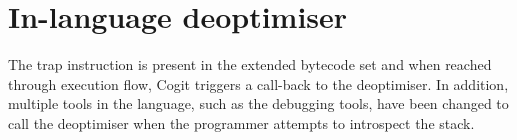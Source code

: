 \documentclass[a4paper,12pt,twoside]{../includes/ThesisStyle}
\begin{document}









\section{In-language deoptimiser}

The trap instruction is present in the extended bytecode set and when reached through execution flow, Cogit triggers a call-back to the deoptimiser. In addition, multiple tools in the language, such as the debugging tools, have been changed to call the deoptimiser when the programmer attempts to introspect the stack.
\end{document}
